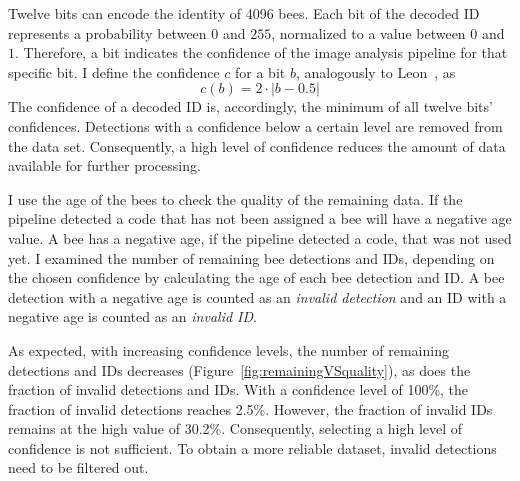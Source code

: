 
Twelve bits can encode the identity of 4096 bees.
Each bit of the decoded ID represents a probability between $0$ and $255$, normalized to a value between $0$ and $1$.
Therefore, a bit indicates the confidence of the image analysis pipeline for that specific bit.
I define the confidence $c$ for a bit $b$, analogously to Leon~\textcite[p.~14]{leon2016}, as $$c(b)=2\cdot|b-0.5|$$
The confidence of a decoded ID is, accordingly, the minimum of all twelve bits' confidences.
Detections with a confidence below a certain level are removed from the data set.
Consequently, a high level of confidence reduces the amount of data available for further processing.

I use the age of the bees to check the quality of the remaining data.
If the pipeline detected a code that has not been assigned a bee will have a negative age value.
A bee has a negative age, if the pipeline detected a code, that was not used yet.
I examined the number of remaining bee detections and IDs, depending on the chosen confidence by calculating the age of each bee detection and ID.
A bee detection with a negative age is counted as an \emph{invalid detection} and an ID with a negative age is counted as an \emph{invalid ID}.

As expected, with increasing confidence levels, the number of remaining detections and IDs decreases (Figure~\ref{fig:remainingVSquality}), as does the fraction of invalid detections and IDs.
With a confidence level of 100\%, the fraction of invalid detections reaches 2.5\%.
However, the fraction of invalid IDs remains at the high value of 30.2\%. Consequently, selecting a high level of confidence is not sufficient.
To obtain a more reliable dataset, invalid detections need to be filtered out.

